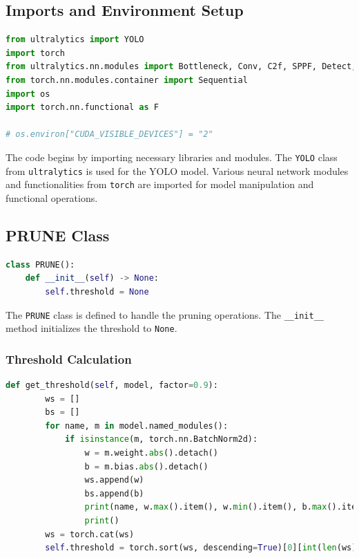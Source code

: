 \subsection{Imports and Environment Setup}

\begin{lstlisting}[language=Python]
from ultralytics import YOLO
import torch
from ultralytics.nn.modules import Bottleneck, Conv, C2f, SPPF, Detect, C3k2
from torch.nn.modules.container import Sequential
import os
import torch.nn.functional as F

# os.environ["CUDA_VISIBLE_DEVICES"] = "2"
\end{lstlisting}

The code begins by importing necessary libraries and modules. The \texttt{YOLO} class from \texttt{ultralytics} is used for the YOLO model. Various neural network modules and functionalities from \texttt{torch} are imported for model manipulation and functional operations.

\subsection{PRUNE Class}

\begin{lstlisting}[language=Python]
class PRUNE():
    def __init__(self) -> None:
        self.threshold = None
\end{lstlisting}

The \texttt{PRUNE} class is defined to handle the pruning operations. The \texttt{\_\_init\_\_} method initializes the threshold to \texttt{None}.

\subsubsection{Threshold Calculation}

\begin{lstlisting}[language=Python]
    def get_threshold(self, model, factor=0.9):
        ws = []
        bs = []
        for name, m in model.named_modules():
            if isinstance(m, torch.nn.BatchNorm2d):
                w = m.weight.abs().detach()
                b = m.bias.abs().detach()
                ws.append(w)
                bs.append(b)
                print(name, w.max().item(), w.min().item(), b.max().item(), b.min().item())
                print()
        ws = torch.cat(ws)
        self.threshold = torch.sort(ws, descending=True)[0][int(len(ws) * factor)]
\end{lstlisting}


